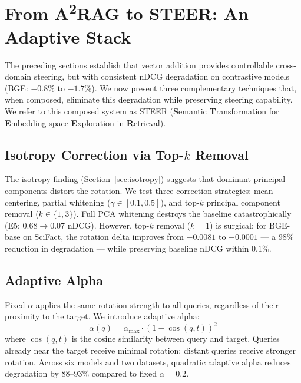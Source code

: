 \documentclass{article}
\begin{document}

\section{From A\textsuperscript{2}RAG to STEER: An Adaptive Stack}
\label{sec:steer}

The preceding sections establish that vector addition provides controllable cross-domain steering, but with consistent nDCG degradation on contrastive models (BGE: $-0.8\%$ to $-1.7\%$). We now present three complementary techniques that, when composed, eliminate this degradation while preserving steering capability. We refer to this composed system as STEER (\textbf{S}emantic \textbf{T}ransformation for \textbf{E}mbedding-space \textbf{E}xploration in \textbf{R}etrieval).

\subsection{Isotropy Correction via Top-$k$ Removal}

The isotropy finding (Section~\ref{sec:isotropy}) suggests that dominant principal components distort the rotation. We test three correction strategies: mean-centering, partial whitening ($\gamma \in [0.1, 0.5]$), and top-$k$ principal component removal ($k \in \{1, 3\}$). Full PCA whitening destroys the baseline catastrophically (E5: $0.68 \to 0.07$ nDCG). However, top-$k$ removal ($k=1$) is surgical: for BGE-base on SciFact, the rotation delta improves from $-0.0081$ to $-0.0001$ --- a 98\% reduction in degradation --- while preserving baseline nDCG within $0.1\%$.

\subsection{Adaptive Alpha}

Fixed $\alpha$ applies the same rotation strength to all queries, regardless of their proximity to the target. We introduce adaptive alpha:
\begin{equation}
\alpha(q) = \alpha_{\max} \cdot \left(1 - \cos(q, t)\right)^2
\end{equation}
where $\cos(q, t)$ is the cosine similarity between query and target. Queries already near the target receive minimal rotation; distant queries receive stronger rotation. Across six models and two datasets, quadratic adaptive alpha reduces degradation by 88--93\% compared to fixed $\alpha = 0.2$.
\end{document}
